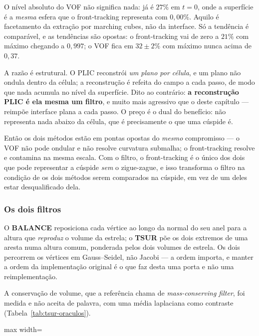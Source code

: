 O n\'ivel absoluto do VOF n\~ao significa nada: j\'a \'e $27\%$ em $t=0$, onde a
superf\'icie \'e a \emph{mesma} esfera que o front-tracking representa com
$0{,}00\%$. Aquilo \'e facetamento da extra\c{c}\~ao por marching cubes, n\~ao
da interface. S\'o a tend\^encia \'e compar\'avel, e as tend\^encias s\~ao
opostas: o front-tracking vai de zero a $21\%$ com m\'aximo chegando a
$0{,}997$; o VOF fica em $32\pm2\%$ com m\'aximo nunca acima de $0{,}37$.

A raz\~ao \'e estrutural. O PLIC reconstr\'oi \emph{um plano por c\'elula}, e um
plano n\~ao ondula dentro da c\'elula; a reconstru\c{c}\~ao \'e refeita do campo
a cada passo, de modo que nada acumula no n\'ivel da superf\'icie. Dito ao
contr\'ario: \textbf{a reconstru\c{c}\~ao PLIC \'e ela mesma um filtro}, e muito
mais agressivo que o deste cap\'itulo --- reimp\~oe interface plana a cada
passo. O pre\c{c}o \'e o dual do benef\'icio: n\~ao representa nada abaixo da
c\'elula, que \'e precisamente o que uma c\'uspide \'e.

Ent\~ao os dois m\'etodos est\~ao em pontas opostas do \emph{mesmo}
compromisso --- o VOF n\~ao pode ondular e n\~ao resolve curvatura submalha; o
front-tracking resolve e contamina na mesma escala. Com o filtro, o
front-tracking \'e o \'unico dos dois que pode representar a c\'uspide
\emph{sem} o zigue-zague, e isso transforma o filtro na condi\c{c}\~ao de os
dois m\'etodos serem comparados na c\'uspide, em vez de um deles estar
desqualificado dela.

\subsubsection{Os dois filtros}

O \textbf{BALANCE} reposiciona cada v\'ertice ao longo da normal do seu anel
para a altura que \emph{reproduz} o volume da estrela; o \textbf{TSUR} p\~oe os
dois extremos de uma aresta numa altura comum, ponderada pelos dois volumes de
estrela. Os dois percorrem os v\'ertices em Gauss--Seidel, n\~ao Jacobi --- a
ordem importa, e manter a ordem da implementa\c{c}\~ao original \'e o que faz
desta uma porta e n\~ao uma reimplementa\c{c}\~ao.

A conserva\c{c}\~ao de volume, que a refer\^encia chama de \emph{mass-conserving
filter}, foi medida e n\~ao aceita de palavra, com uma m\'edia laplaciana como
contraste (Tabela~\ref{tab:tsur-oraculos}).

\begin{table}[htbp]
\centering
\caption{Os seis or\'aculos. Os n\'umeros s\~ao id\^enticos na vers\~ao em
\'arvore e na c\'opia port\'avel entregue para a porta no OpenFOAM.}
\label{tab:tsur-oraculos}
\small
\begin{adjustbox}{max width=\linewidth}
\end{adjustbox}
\end{table}

